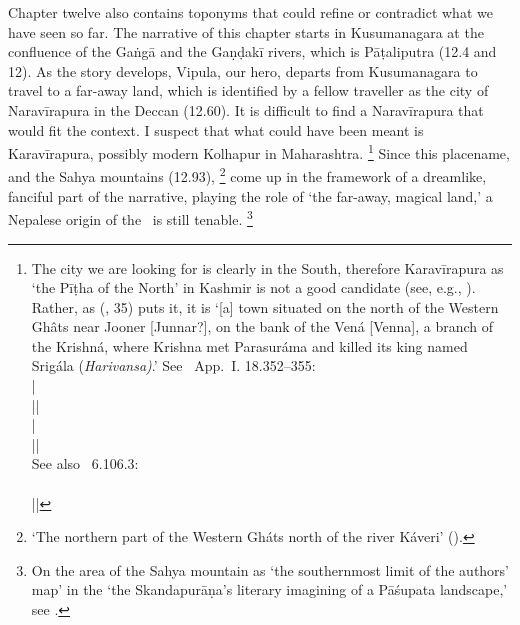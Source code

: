  Chapter twelve also contains toponyms that could
 refine or contradict what we have seen so far.
 The narrative of this chapter starts in Kusumanagara
 at the confluence of the Gaṅgā and the Gaṇḍakī rivers, 
 which is Pāṭali\-putra (12.4 and 12). As the story
 develops, Vipula, our hero, departs from Ku\-su\-ma\-na\-gara
 to travel to a far-away land, which is identified by a 
 fellow traveller as the city of Naravīrapura in the 
 Deccan (12.60).
\label{naravirapura} It is difficult to find a Naravīrapura that would fit
 the context. I suspect that what could have been meant
 is Karavīrapura, possibly modern Kolhapur
 in Maharashtra.%
	\footnote{The city we are looking for is clearly in
						the South, therefore Karavīrapura as
						`the Pīṭha of the North' in Kashmir is
						not a good candidate (see, e.g., 
						). Rather,
						as \citeauthor{DeyGeography} 
						(\citeyear{DeyGeography}, {35}) puts it, it is
						`[a] town situated on the north of the
						Western Gh\^ats near Jooner [Junnar?], 
						on the bank of the Vená [Venna], 
						a branch of the Krishná,
						where Krishna met Parasuráma and
						killed its king named Srigála (\textit{Harivansa)}.'
						See \Harivamsa\ App.~I. 18.352--355:\\
						 |\\
						 ||\\
						 |\\
						 ||\\
					See also \PadmaP\ 6.106.3:\\
						  \\
					     ||}
Since this placename, and 
the Sahya mountains (12.93),%
 	\footnote{`The northern part of the Western Gháts
north of the river Káveri' ().}
come up in the framework of a dreamlike, fanciful part of
the narrative, playing the role of `the far-away, magical
land,' a Nepalese origin of the \VSS\ is still tenable.%
		\footnote{On the area of the Sahya mountain as `the southernmost limit of the authors' map'
                in the `the Skandapurāṇa's literary imagining of a Pāśupata landscape,' see 
                .}
 

